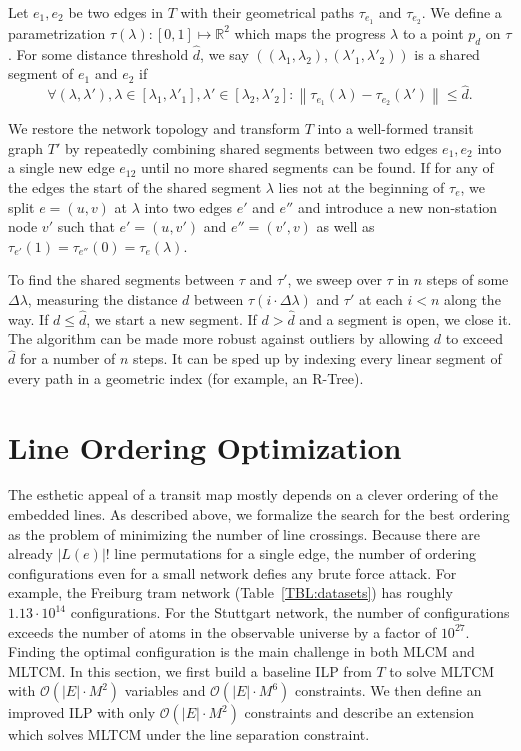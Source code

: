 \documentclass{llncs}
\begin{document}
Let $e_1, e_2$ be two edges in $T$ with their geometrical paths $\tau_{e_1}$ and $\tau_{e_2}$. We define a parametrization $\tau(\lambda): [0,1] \mapsto \mathbb{R}^2$ which maps the progress $\lambda$ to a point $p_d$ on $\tau$. For some distance threshold $\hat{d}$, we say $\left(\left(\lambda_1, \lambda_2\right), \left({\lambda'}_1, {\lambda'}_2\right)\right)$ is a shared segment of $e_1$ and $e_2$ if \[\forall (\lambda, \lambda'), \lambda \in [\lambda_1, {\lambda'}_1], \lambda' \in [\lambda_2, {\lambda'}_2] : \left\|\tau_{e_1}\left(\lambda\right) - \tau_{e_2}\left(\lambda'\right)\right\| \leq \hat{d}.\]

We restore the network topology and transform $T$ into a well-formed transit graph $T'$ by repeatedly combining shared segments between two edges $e_1, e_2$ into a single new edge $e_{12}$ until no more shared segments can be found. If for any of the edges the start of the shared segment $\lambda$ lies not at the beginning of $\tau_e$, we split $e = (u, v)$ at $\lambda$ into two edges $e'$ and $e''$ and introduce a new non-station node $v'$ such that $e' = (u, v')$ and $e'' = (v', v)$ as well as $\tau_{e'}(1) = \tau_{e''}(0) = \tau_{e}(\lambda)$.

To find the shared segments between $\tau$ and $\tau'$, we sweep over $\tau$ in $n$ steps of some $\Delta\lambda$, measuring the distance $d$ between $\tau(i\cdot\Delta\lambda)$ and $\tau'$ at each $i < n$ along the way. If $d \leq \hat{d}$, we start a new segment. If $d > \hat{d}$ and a segment is open, we close it. The algorithm can be made more robust against outliers by allowing $d$ to exceed $\hat{d}$ for a number of $n$ steps. It can be sped up by indexing every linear segment of every path in a geometric index (for example, an R-Tree).

%
\section{Line Ordering Optimization}\label{SEC:ordering}
%

The esthetic appeal of a transit map mostly depends on a clever ordering of the embedded lines.
As described above, we formalize the search for the best ordering as the problem of minimizing the number of line crossings.
Because there are already $\left|L\left(e\right)\right|!$ line permutations for a single edge, the number of ordering configurations even for a small network defies any brute force attack.
For example, the Freiburg tram network (Table~\ref{TBL:datasets}) has roughly $1.13 \cdot 10^{14}$ configurations.
For the Stuttgart network, the number of configurations exceeds the number of atoms in the observable universe by a factor of $10^{27}$.
Finding the optimal configuration is the main challenge in both MLCM and MLTCM.
In this section, we first build a baseline ILP from $T$ to solve MLTCM with $\mathcal{O}(|E| \cdot M^{2})$ variables and $\mathcal{O}(|E| \cdot M^{6})$ constraints. We then define an improved ILP with only $\mathcal{O}(|E|\cdot M^2)$ constraints and describe an extension which solves MLTCM under the line separation constraint.
\end{document}
